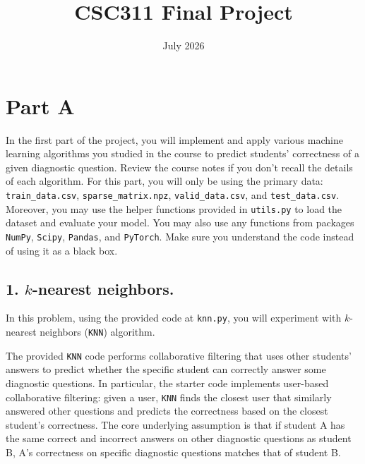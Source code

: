 \documentclass[11pt]{article}
\title{CSC311 Final Project}
\date{July 2026}
\begin{document}
\maketitle

\section*{Part A}

In the first part of the project, you will implement and apply various machine learning algorithms you studied in the course to predict students’ correctness of a given diagnostic question. Review the course notes if you don’t recall the details of each algorithm. For this part, you will only be using the primary data: \verb|train_data.csv|, \verb|sparse_matrix.npz|, \verb|valid_data.csv|, and \verb|test_data.csv|. Moreover, you may use the helper functions provided in \verb|utils.py| to load the dataset and evaluate your model. You may also use any functions from packages \verb|NumPy|, \verb|Scipy|, \verb|Pandas|, and \verb|PyTorch|. Make sure you understand the code instead of using it as a black box.

\subsection*{1. $k$-nearest neighbors.} In this problem, using the provided code at \verb|knn.py|, you will experiment with $k$-nearest neighbors (\verb|KNN|) algorithm.

The provided \verb|KNN| code performs collaborative filtering that uses other students’ answers to predict whether the specific student can correctly answer some diagnostic questions. In particular, the starter code implements user-based collaborative filtering: given a user, \verb|KNN| finds the closest user that similarly answered other questions and predicts the correctness based on the closest student’s correctness. The core underlying assumption is that if student A has the same correct and incorrect answers on other diagnostic questions as student B, A’s correctness on specific diagnostic questions matches that of student B.
\end{document}
